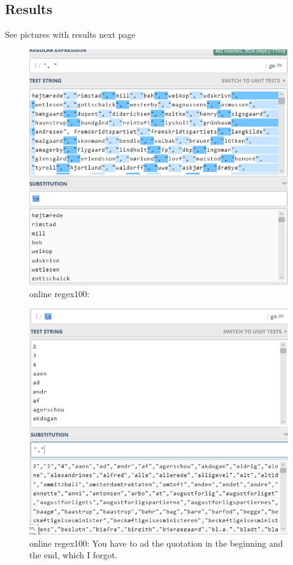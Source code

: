 \documentclass{article}
\begin{document}
\subsection{Results} See pictures with results next page
\begin{figure}[H]
    \centering
    \includegraphics[width=\textwidth]{foto1.PNG}
    \caption{online regex100:}
    \label{fig:bil1}
\end{figure}
\begin{figure}[H]
    \centering
    \includegraphics[width=\textwidth]{foto2.PNG}
    \caption{online regex100: You have to ad the quotation in the beginning and the end, which I forgot.}
    \label{fig:bil2}
\end{figure}
\end{document}

